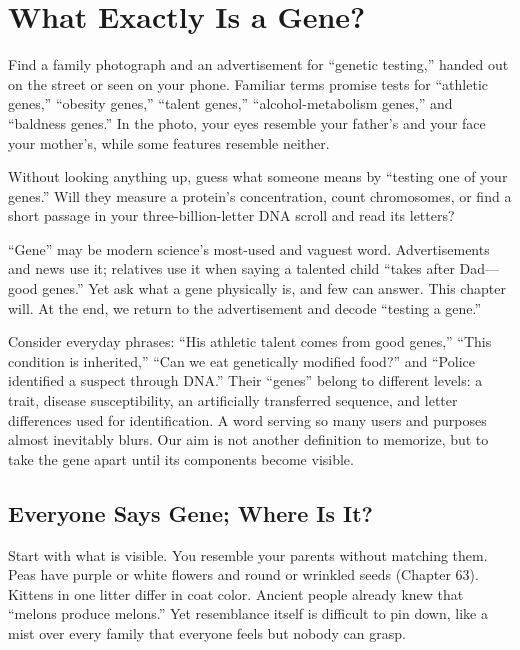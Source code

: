 \chapter{What Exactly Is a Gene?}

\begin{kaichang}
Find a family photograph and an advertisement for ``genetic testing,'' handed out on the street or seen on your phone. Familiar terms promise tests for ``athletic genes,'' ``obesity genes,'' ``talent genes,'' ``alcohol-metabolism genes,'' and ``baldness genes.'' In the photo, your eyes resemble your father's and your face your mother's, while some features resemble neither.

Without looking anything up, guess what someone means by ``testing one of your genes.'' Will they measure a protein's concentration, count chromosomes, or find a short passage in your three-billion-letter DNA scroll and read its letters?

``Gene'' may be modern science's most-used and vaguest word. Advertisements and news use it; relatives use it when saying a talented child ``takes after Dad---good genes.'' Yet ask what a gene physically is, and few can answer. This chapter will. At the end, we return to the advertisement and decode ``testing a gene.''

Consider everyday phrases: ``His athletic talent comes from good genes,'' ``This condition is inherited,'' ``Can we eat genetically modified food?'' and ``Police identified a suspect through DNA.'' Their ``genes'' belong to different levels: a trait, disease susceptibility, an artificially transferred sequence, and letter differences used for identification. A word serving so many users and purposes almost inevitably blurs. Our aim is not another definition to memorize, but to take the gene apart until its components become visible.
\end{kaichang}

\section{Everyone Says Gene; Where Is It?}

Start with what is visible. You resemble your parents without matching them. Peas have purple or white flowers and round or wrinkled seeds (Chapter 63). Kittens in one litter differ in coat color. Ancient people already knew that ``melons produce melons.'' Yet resemblance itself is difficult to pin down, like a mist over every family that everyone feels but nobody can grasp.

